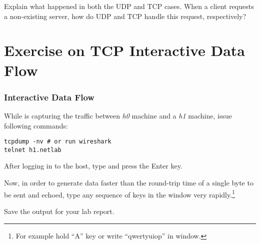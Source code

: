 \documentclass{../UTNetLab}
\begin{document}
    \begin{report}
        \item Explain what happened in both the UDP and TCP cases.
                When a client requests a non-existing server, how do UDP and TCP handle this request, respectively?
    \end{report}

\part{Exercise on TCP Interactive Data Flow}
\section{Interactive Data Flow}
While  is capturing the traffic between \textit{h0} machine and a \textit{h1} machine, issue following commands:
    \begin{lstlisting}[emph={h1,netlab}]
tcpdump -nv # or run wireshark
telnet h1.netlab
    \end{lstlisting}
    After logging in to the host, type  and press the {Enter} key.

    Now, in order to generate data faster than the round-trip time of a single byte to be sent and echoed, type any sequence of keys in the  window very rapidly.\footnote{For example hold ``A'' key or write ``qwertyuiop'' in  window.}

    {Save} the  output for your lab report.
    
\end{document}
